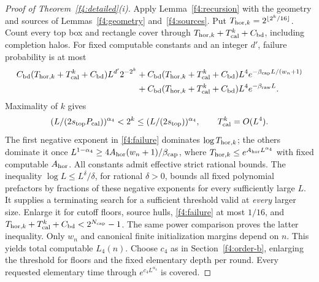 \begin{proof}[Proof of Theorem~\ref{f4:detailed}(i)]
Apply Lemma~\ref{f4:recursion} with the geometry and sources
of Lemmas~\ref{f4:geometry} and~\ref{f4:sources}. Put
\(T_{{\rm hor},k}=2^{\lfloor2^k/16\rfloor}\). Count every top box and rectangle
cover through \(T_{{\rm hor},k}+T_{\rm cal}^k+C_{\rm bd}\), including completion halos. For fixed
computable constants and an integer \(d'\), failure probability is at
most
\begin{equation}\label{f4:failure}
\begin{split}
 C_{\rm bd}(T_{{\rm hor},k}+T_{\rm cal}^k+C_{\rm bd})L^{d'}2^{-2^k}
 &+C_{\rm bd}(T_{{\rm hor},k}+T_{\rm cal}^k+C_{\rm bd})L^4e^{-\beta_{\rm cap} L/(w_n+1)}\\
 &+C_{\rm bd}(T_{{\rm hor},k}+T_{\rm cal}^k+C_{\rm bd})L^4e^{-\beta_{\rm raw}L}.
\end{split}
\end{equation}
Maximality of \(k\) gives
\[
 (L/(2s_{\rm top}P_{\rm cal}))^{\alpha_4}<2^k
             \le(L/(2s_{\rm top}))^{\alpha_4},\qquad T_{\rm cal}^k=O(L^4).
\]
The first negative exponent in \eqref{f4:failure} dominates
\(\log T_{{\rm hor},k}\); the others dominate it once
\(L^{1-\alpha_4}\ge4A_{\rm hor}(w_n+1)/\beta_{\rm cap}\), where
\(T_{{\rm hor},k}\le e^{A_{\rm hor}L^{\alpha_4}}\) with fixed computable
\(A_{\rm hor}\). All constants admit effective strict rational
bounds. The inequality \(\log L\le L^\delta/\delta\), for rational
\(\delta>0\), bounds all fixed polynomial prefactors by fractions
of these negative exponents for every sufficiently large \(L\).
It supplies a terminating search for a sufficient threshold valid at
\emph{every} larger size. Enlarge it for cutoff floors, source hulls,
\eqref{f4:failure} at most \(1/16\), and
\(T_{{\rm hor},k}+T_{\rm cal}^k+C_{\rm bd}<2^{N_{\rm cap}}-1\). The same power comparison proves
the latter inequality. Only \(w_n\) and canonical finite initialization
margins depend on \(n\). This yields total computable \(L_4(n)\).
Choose \(c_4\) as in Section~\ref{f4:order-b}, enlarging the threshold
for floors and the fixed elementary depth per round. Every requested
elementary time through \(e^{c_4L^{\alpha_4}}\) is covered.


\end{proof}
